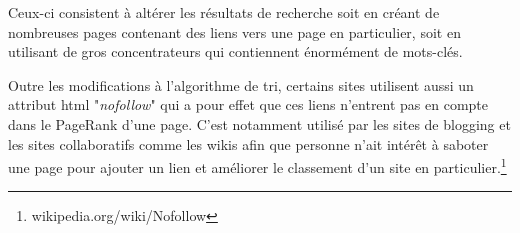 	Ceux-ci consistent à altérer les résultats de recherche soit en créant de nombreuses pages contenant des liens vers une page en particulier, soit en utilisant de gros concentrateurs qui contiennent énormément de mots-clés.

	Outre les modifications à l'algorithme de tri, certains sites utilisent aussi un attribut html "\textit{nofollow}" qui a pour effet que ces liens n'entrent pas en compte dans le PageRank d'une page. C'est notamment utilisé par les sites de blogging et les sites collaboratifs comme les wikis afin que personne n'ait intérêt à saboter une page pour ajouter un lien et améliorer le classement d'un site en particulier.\footnote{wikipedia.org/wiki/Nofollow}

